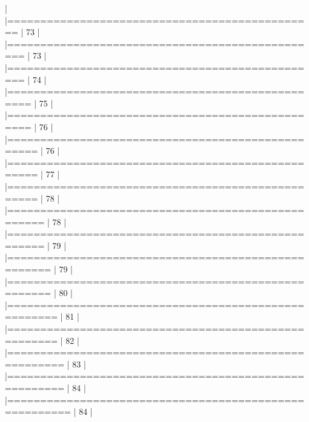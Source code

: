 \documentclass[10pt]{article}
\newenvironment{CodeChunk}{}{}
\begin{document}
\begin{CodeChunk}
\begin{CodeChunk}
\begin{CodeOutput}
  |                                                                       
  |===============================================                  |  73%
  |                                                                       
  |================================================                 |  73%
  |                                                                       
  |================================================                 |  74%
  |                                                                       
  |=================================================                |  75%
  |                                                                       
  |=================================================                |  76%
  |                                                                       
  |==================================================               |  76%
  |                                                                       
  |==================================================               |  77%
  |                                                                       
  |==================================================               |  78%
  |                                                                       
  |===================================================              |  78%
  |                                                                       
  |===================================================              |  79%
  |                                                                       
  |====================================================             |  79%
  |                                                                       
  |====================================================             |  80%
  |                                                                       
  |=====================================================            |  81%
  |                                                                       
  |=====================================================            |  82%
  |                                                                       
  |======================================================           |  83%
  |                                                                       
  |======================================================           |  84%
  |                                                                       
  |=======================================================          |  84%
  |                                                                       

\end{CodeOutput}
\end{CodeChunk}
\end{CodeChunk}
\end{document}
